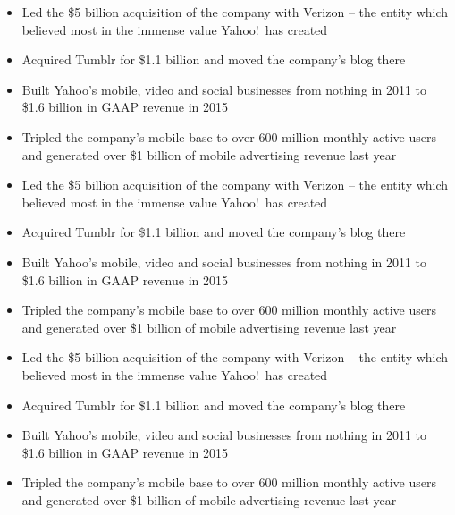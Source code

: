\documentclass[10pt,a4paper,ragged2e,withhyper]{altacv}
\begin{document}
	\begin{paracol}{2}
		
		
		\begin{itemize}
			\item Led the \$5 billion acquisition of the company with Verizon -- the entity which believed most in the immense value Yahoo!\ has created
			\item Acquired Tumblr for \$1.1 billion and moved the company's blog there
			\item Built Yahoo's mobile, video and social businesses from nothing in 2011 to \$1.6 billion in GAAP revenue in 2015
			\item Tripled the company's mobile base to over 600 million monthly active users and generated over \$1 billion of mobile advertising revenue last year
		\end{itemize}
		
		\divider
		
		\begin{itemize}
			\item Led the \$5 billion acquisition of the company with Verizon -- the entity which believed most in the immense value Yahoo!\ has created
			\item Acquired Tumblr for \$1.1 billion and moved the company's blog there
			\item Built Yahoo's mobile, video and social businesses from nothing in 2011 to \$1.6 billion in GAAP revenue in 2015
			\item Tripled the company's mobile base to over 600 million monthly active users and generated over \$1 billion of mobile advertising revenue last year
		\end{itemize}
		
		\divider
		
		\begin{itemize}
			\item Led the \$5 billion acquisition of the company with Verizon -- the entity which believed most in the immense value Yahoo!\ has created
			\item Acquired Tumblr for \$1.1 billion and moved the company's blog there
			\item Built Yahoo's mobile, video and social businesses from nothing in 2011 to \$1.6 billion in GAAP revenue in 2015
			\item Tripled the company's mobile base to over 600 million monthly active users and generated over \$1 billion of mobile advertising revenue last year
		\end{itemize}
		

\end{paracol}
\end{document}
